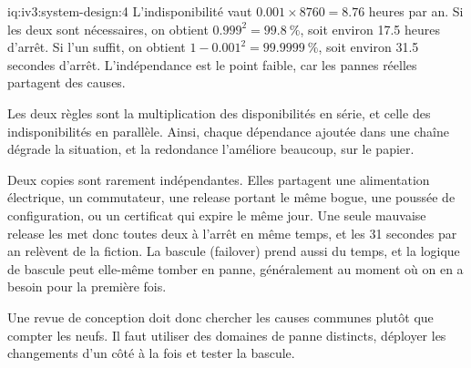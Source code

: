\begin{solution}{iq:iv3:system-design:4}
L'indisponibilité vaut $0.001 \times 8760 = 8.76$ heures par an. Si les deux sont nécessaires, on obtient $0.999^2 = 99.8~\%$, soit environ 17.5 heures d'arrêt. Si l'un suffit, on obtient $1 - 0.001^2 = 99.9999~\%$, soit environ 31.5 secondes d'arrêt. L'indépendance est le point faible, car les pannes réelles partagent des causes.

Les deux règles sont la multiplication des disponibilités en série, et celle des indisponibilités en parallèle. Ainsi, chaque dépendance ajoutée dans une chaîne dégrade la situation, et la redondance l'améliore beaucoup, sur le papier.

Deux copies sont rarement indépendantes. Elles partagent une alimentation électrique, un commutateur, une release portant le même bogue, une poussée de configuration, ou un certificat qui expire le même jour. Une seule mauvaise release les met donc toutes deux à l'arrêt en même temps, et les 31 secondes par an relèvent de la fiction. La bascule (failover) prend aussi du temps, et la logique de bascule peut elle-même tomber en panne, généralement au moment où on en a besoin pour la première fois.

Une revue de conception doit donc chercher les causes communes plutôt que compter les neufs. Il faut utiliser des domaines de panne distincts, déployer les changements d'un côté à la fois et tester la bascule.

\end{solution}

